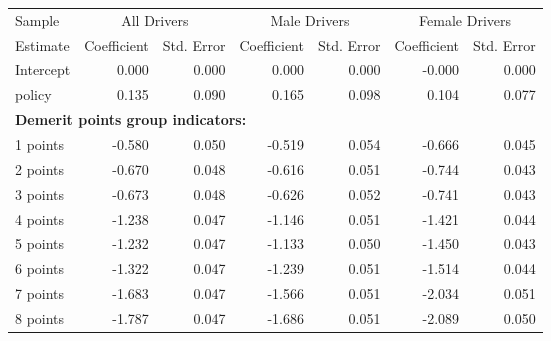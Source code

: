 
\begin{table}%
\centering 
\begin{tabular}{l r r r r r r} 

\hline 
 

Sample 
 & \multicolumn{2}{c}{All  Drivers}  & \multicolumn{2}{c}{Male  Drivers}  & \multicolumn{2}{c}{Female  Drivers}   \\ 
 

 \cmidrule(lr){1-1}\cmidrule(lr){2-3}\cmidrule(lr){4-5}\cmidrule(lr){6-7} 

Estimate  & Coefficient & Std. Error  & Coefficient & Std. Error  & Coefficient & Std. Error   \\ 
 

\hline 
 
Intercept  &  0.000  &  0.000  &  0.000  &  0.000  & -0.000  &  0.000   \\ 
 
policy  &  0.135  &  0.090  &  0.165  &  0.098  &  0.104  &  0.077   \\ 
 

\hline 
 
\multicolumn{4}{l}{\textbf{Demerit points group indicators:}}  \\ 
 
1 points  & -0.580  &  0.050  & -0.519  &  0.054  & -0.666  &  0.045   \\ 
 
2 points  & -0.670  &  0.048  & -0.616  &  0.051  & -0.744  &  0.043   \\ 
 
3 points  & -0.673  &  0.048  & -0.626  &  0.052  & -0.741  &  0.043   \\ 
 
4 points  & -1.238  &  0.047  & -1.146  &  0.051  & -1.421  &  0.044   \\ 
 
5 points  & -1.232  &  0.047  & -1.133  &  0.050  & -1.450  &  0.043   \\ 
 
6 points  & -1.322  &  0.047  & -1.239  &  0.051  & -1.514  &  0.044   \\ 
 
7 points  & -1.683  &  0.047  & -1.566  &  0.051  & -2.034  &  0.051   \\ 
 
8 points  & -1.787  &  0.047  & -1.686  &  0.051  & -2.089  &  0.050   \\ 
 

\end{tabular}
\end{table}
